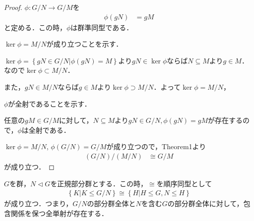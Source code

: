 \begin{proof}
    $\phi : G/N\to G/M$を
    \begin{align}
        \phi(gN) &= gM
    \end{align}
    と定める．この時，$\phi$は群準同型である．

    $\ker\phi=M/N$が成り立つことを示す．

    $\ker\phi = \left\{ gN \in G/N | \phi(gN) = M\right\}$より$gN\in \ker\phi$ならば$N \subseteq M$より$g\in M$．なので$\ker\phi \subset M/N$．

    また，$gN\in M/N$ならば$g\in M$より$\ker\phi \supset M/N$．よって$\ker\phi=M/N$，

    $\phi$が全射であることを示す．

    任意の$gM\in G/M$に対して，$N \subseteq M$より$gN\in G/N,\phi(gN)=gM$が存在するので，$\phi$は全射である．

    $\ker\phi=M/N$, $\phi(G/N)=G/M$が成り立つので，Theorem1より
    \begin{align}
        (G/N)/(M/N) &\cong G/M
    \end{align}
    が成り立つ．
\end{proof}
\begin{theorem}
$G$を群，$N\lhd G$を正規部分群とする．この時，$\cong $を順序同型として
    \begin{align}
        \left\{ K | K \leq  G/N\right\}\cong \left\{ H | H\leq  G , N \leq   H \right\}
    \end{align}
が成り立つ．つまり，$G/N$の部分群全体と$N$を含む$G$の部分群全体に対して，包含関係を保つ全単射が存在する．
\end{theorem}

